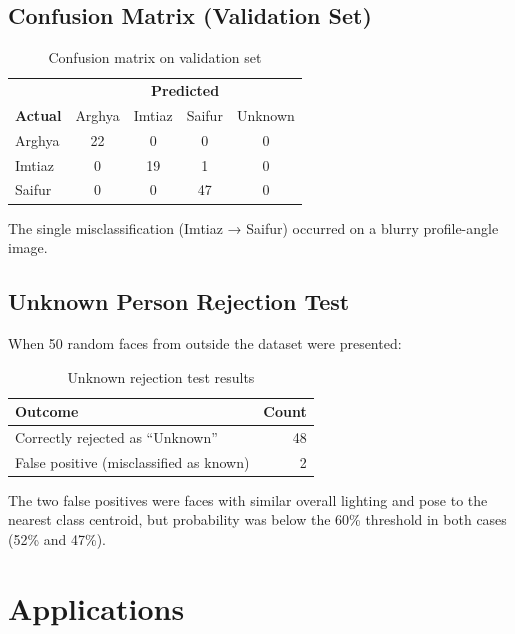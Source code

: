 \documentclass[12pt,a4paper]{article}
\begin{document}
\subsection*{Confusion Matrix (Validation Set)}
\begin{table}[H]
\centering
\begin{tabular}{lcccc}
\toprule
 & \multicolumn{4}{c}{\textbf{Predicted}} \\
\textbf{Actual} & Arghya & Imtiaz & Saifur & Unknown \\
\midrule
Arghya & 22 & 0 & 0 & 0 \\
Imtiaz & 0 & 19 & 1 & 0 \\
Saifur & 0 & 0 & 47 & 0 \\
\bottomrule
\end{tabular}
\caption{Confusion matrix on validation set}
\end{table}

The single misclassification (Imtiaz → Saifur) occurred on a blurry profile-angle image.

\subsection*{Unknown Person Rejection Test}

When 50 random faces from outside the dataset were presented:

\begin{table}[H]
\centering
\begin{tabular}{lr}
\toprule
\textbf{Outcome} & \textbf{Count} \\
\midrule
Correctly rejected as ``Unknown'' & 48 \\
False positive (misclassified as known) & 2 \\
\bottomrule
\end{tabular}
\caption{Unknown rejection test results}
\end{table}

The two false positives were faces with similar overall lighting and pose to the nearest class centroid, but probability was below the 60\% threshold in both cases (52\% and 47\%).

\section{Applications}
\end{document}
